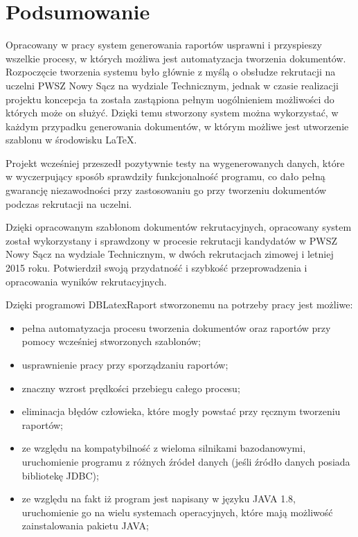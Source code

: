 \chapter{Podsumowanie}
Opracowany w pracy system generowania raportów usprawni i przyspieszy wszelkie procesy, w których możliwa jest automatyzacja tworzenia dokumentów. Rozpoczęcie tworzenia systemu było głównie z myślą o obsłudze rekrutacji na uczelni PWSZ Nowy Sącz na wydziale Technicznym, jednak w czasie realizacji projektu koncepcja ta została zastąpiona pełnym uogólnieniem możliwości do których może on służyć. Dzięki temu stworzony system można wykorzystać, w każdym przypadku generowania dokumentów, w którym możliwe jest utworzenie szablonu w środowisku LaTeX.
\vspace{5mm}
\par
Projekt wcześniej przeszedł pozytywnie testy na wygenerowanych danych, które w wyczerpujący sposób sprawdziły funkcjonalność programu, co dało pełną gwarancję niezawodności przy zastosowaniu go przy tworzeniu dokumentów podczas rekrutacji na uczelni.
\vspace{5mm} 

Dzięki opracowanym szablonom dokumentów rekrutacyjnych, opracowany system został wykorzystany i sprawdzony w procesie rekrutacji kandydatów w PWSZ Nowy Sącz na wydziale Technicznym, w dwóch rekrutacjach zimowej i letniej 2015 roku. Potwierdził swoją przydatność i szybkość przeprowadzenia i opracowania wyników rekrutacyjnych. 
\vspace{5mm}
\par
Dzięki programowi DBLatexRaport stworzonemu na potrzeby pracy jest możliwe:\vspace{5mm}
\begin{itemize}
\item pełna automatyzacja procesu tworzenia dokumentów oraz raportów przy pomocy wcześniej stworzonych szablonów;\vspace{5mm}
\item usprawnienie pracy przy sporządzaniu raportów;\vspace{5mm}
\item znaczny wzrost prędkości przebiegu całego procesu;\vspace{5mm}
\item eliminacja błędów człowieka, które mogły powstać przy ręcznym tworzeniu raportów;\vspace{5mm}
\item ze względu na kompatybilność z wieloma silnikami bazodanowymi, uruchomienie programu z różnych źródeł danych (jeśli źródło danych posiada bibliotekę JDBC);\vspace{5mm}
\item ze względu na fakt iż program jest napisany w języku JAVA 1.8, uruchomienie go na wielu systemach operacyjnych, które mają możliwość zainstalowania pakietu JAVA;\vspace{5mm}
\end{itemize}\vspace{5mm}


